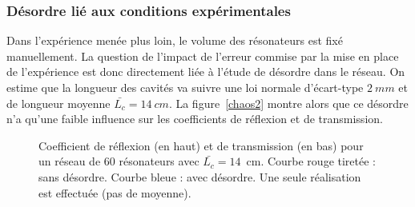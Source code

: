 \subsubsection*{Désordre lié aux conditions expérimentales} 
Dans l'expérience menée plus loin, le volume des résonateurs est fixé manuellement. La question de l'impact de l'erreur commise par la mise en place de l'expérience est donc directement liée à l'étude de désordre dans le réseau. On estime que la longueur des cavités va suivre une loi normale d'écart-type $2~mm$ et de longueur moyenne $\bar{L_c}=14~cm$. La figure~\ref{chaos2} montre alors que ce désordre n'a qu'une faible influence sur les coefficients de réflexion et de transmission. 


\begin{figure}[!h]
		\caption{ Coefficient de réflexion (en haut) et de transmission (en bas) pour un réseau de 60 résonateurs avec $\bar{L_c}=14$~cm. Courbe rouge tiretée : sans désordre. Courbe bleue : avec désordre. Une seule réalisation est effectuée (pas de moyenne).}
\end{figure}



